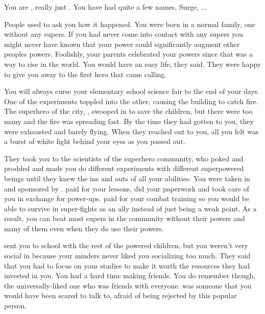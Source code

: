 \documentclass[char]{LRSguildcamp1}
\begin{document}
\name{\cYS{}}

You are \cYS{}, really just \cYS{\intro}. You have had quite a few names, Surge, \cYS{\Mysupername}...

People used to ask you how it happened. You were born in a normal family, one without any supers. If you had never come into contact with any supers you might never have known that your power could significantly augment other peoples powers. Foolishly, your parents celebrated your powers since that was a way to rise in the world. You would have an easy life, they said. They were happy to give you away to the first hero that came calling. 

You will always curse your elementary school science fair to the end of your days. One of the experiments toppled into the other, causing the building to catch fire. The superhero of the city, \cEther{}, swooped in to save the children, but there were too many and the fire was spreading fast. By the time they had gotten to you, they were exhausted and barely flying. When they reached out to you, all you felt was a burst of white light behind your eyes as you passed out. 

They took you to the scientists of the superhero community, who poked and prodded and made you do different experiments with different superpowered beings until they knew the ins and outs of all your abilities. You were taken in and sponsored by \cEther{\them}. \cEther{\They} paid for your lessons, did your paperwork and took care of you in exchange for power-ups. \cEther{\They} paid for your combat training so you would be able to survive in super-fights as an ally instead of just being a weak point. As a result, you can beat most supers in the community without their powers and many of them even when they do use their powers. 

\cEther{\they} sent you to school with the rest of the powered children, but you weren't very social in \pSuperSchool{} because your minders never liked you socializing too much. They said that you had to focus on your studies to make it worth the resources they had invested in you. You had a hard time making friends. You do remember \cYoungest{} though, the universally-liked one who was friends with everyone. \cYoungest{} was someone that you would have been scared to talk to, afraid of being rejected by this popular person.  
\end{document}
